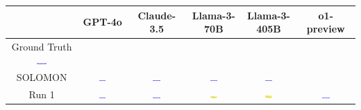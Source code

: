 \begin{table}[H]
    \centering
    \begin{tabular}{|c|c|c|c|c|c|}
    \hline
    & GPT-4o & Claude-3.5 & Llama-3-70B & Llama-3-405B & o1-preview \\
    \hline
    Ground Truth {\includegraphics[width=0.15\textwidth]{examples_png/ViaConnection.png}} & & & & &  \\
    \hline
    SOLOMON & \includegraphics[width=0.15\textwidth]{./pool_all/png/gpt-4o_results/ViaConnection.png} & \includegraphics[width=0.15\textwidth]{./pool_all/png/claude-3-5-sonnet-20240620_results/ViaConnection.png} & \includegraphics[width=0.15\textwidth]{./pool_all/png/watsonx_meta-llama_llama-3-1-70b-instruct_results/ViaConnection.png} & \includegraphics[width=0.15\textwidth]{./pool_all/png/watsonx_meta-llama_llama-3-405b-instruct_results/ViaConnection.png} & \\
    \hline
    Run 1 & \includegraphics[width=0.15\textwidth]{./run_1/png/gpt-4o_results/ViaConnection.png} & \includegraphics[width=0.15\textwidth]{./run_1/png/claude-3-5-sonnet-20240620_results/ViaConnection.png} & \includegraphics[width=0.15\textwidth]{./run_1/png/watsonx_meta-llama_llama-3-1-70b-instruct_results/ViaConnection.png} & \includegraphics[width=0.15\textwidth]{./run_1/png/watsonx_meta-llama_llama-3-405b-instruct_results/ViaConnection.png} & \includegraphics[width=0.15\textwidth]{./run_1/png/o1-preview_results/ViaConnection.png} \\

\end{tabular}
\end{table}
